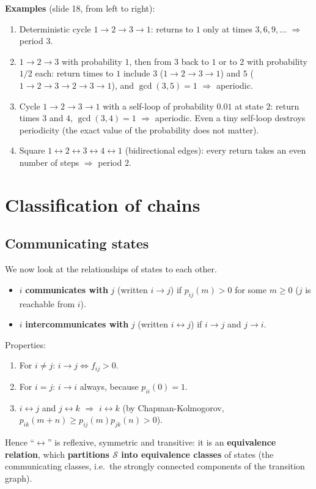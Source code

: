 \textbf{Examples} (slide 18, from left to right):
\begin{enumerate}
    \item Deterministic cycle $1 \to 2 \to 3 \to 1$: returns to $1$ only at times $3, 6, 9, \dots$ $\Rightarrow$ period $3$.
    \item $1 \to 2 \to 3$ with probability $1$, then from $3$ back to $1$ or to $2$ with probability $1/2$ each: return times to $1$ include $3$ ($1\to2\to3\to1$) and $5$ ($1\to2\to3\to2\to3\to1$), and $\gcd(3,5) = 1$ $\Rightarrow$ aperiodic.
    \item Cycle $1 \to 2 \to 3 \to 1$ with a self-loop of probability $0.01$ at state $2$: return times $3$ and $4$, $\gcd(3,4) = 1$ $\Rightarrow$ aperiodic. Even a tiny self-loop destroys periodicity (the exact value of the probability does not matter).
    \item Square $1 \leftrightarrow 2 \leftrightarrow 3 \leftrightarrow 4 \leftrightarrow 1$ (bidirectional edges): every return takes an even number of steps $\Rightarrow$ period $2$.
\end{enumerate}

\section{Classification of chains}

\subsection{Communicating states}

We now look at the relationships of states to each other.

\begin{definition}[Communication]
\begin{itemize}
    \item $i$ \textbf{communicates with} $j$ (written $i \to j$) if $p_{ij}(m) > 0$ for some $m \geq 0$ ($j$ is reachable from $i$).
    \item $i$ \textbf{intercommunicates with} $j$ (written $i \leftrightarrow j$) if $i \to j$ and $j \to i$.
\end{itemize}
\end{definition}

Properties:
\begin{enumerate}
    \item[(a)] For $i \neq j$: $i \to j \iff f_{ij} > 0$.
    \item[(b)] For $i = j$: $i \to i$ always, because $p_{ii}(0) = 1$.
    \item[(c)] $i \leftrightarrow j$ and $j \leftrightarrow k$ $\Rightarrow$ $i \leftrightarrow k$ (by Chapman-Kolmogorov, $p_{ik}(m+n) \geq p_{ij}(m)p_{jk}(n) > 0$).
\end{enumerate}
Hence ``$\leftrightarrow$'' is reflexive, symmetric and transitive: it is an \textbf{equivalence relation}, which \textbf{partitions $\mathcal{S}$ into equivalence classes} of states (the communicating classes, i.e.\ the strongly connected components of the transition graph).

